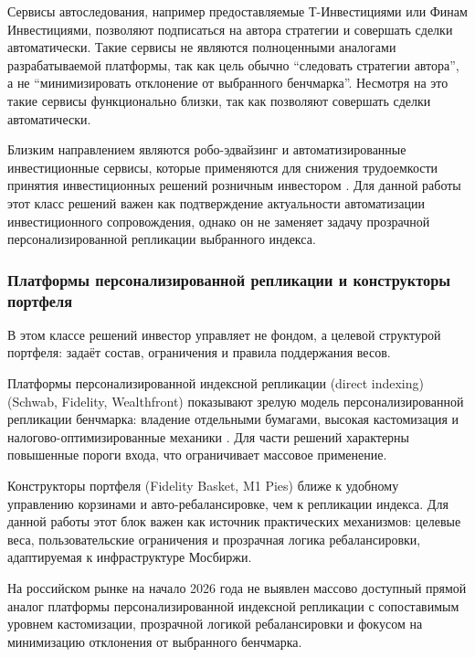 \documentclass[14pt]{gost-7-32}
\begin{document}
Сервисы автоследования, например предоставляемые Т-Инвестициями или Финам Инвестициями, позволяют подписаться на автора стратегии и совершать сделки автоматически. Такие сервисы не являются полноценными аналогами разрабатываемой платформы, так как цель обычно ``следовать стратегии автора'', а не ``минимизировать отклонение от выбранного бенчмарка''. Несмотря на это такие сервисы функционально близки, так как позволяют совершать сделки автоматически.

Близким направлением являются робо-эдвайзинг и автоматизированные инвестиционные сервисы, которые применяются для снижения трудоемкости принятия инвестиционных решений розничным инвестором \cite{loginovFactorInvesting2023,burakRoboAdvising2025}. Для данной работы этот класс решений важен как подтверждение актуальности автоматизации инвестиционного сопровождения, однако он не заменяет задачу прозрачной персонализированной репликации выбранного индекса.

\subsubsection{Платформы персонализированной репликации и конструкторы портфеля}

В этом классе решений инвестор управляет не фондом, а целевой структурой портфеля: задаёт состав, ограничения и правила поддержания весов.

Платформы персонализированной индексной репликации (direct indexing) (Schwab, Fidelity, Wealthfront)\cite{schwabDirectIndexing,fidelityDirectIndexingOverview,wealthfrontInvesting} показывают зрелую модель персонализированной репликации бенчмарка: владение отдельными бумагами, высокая кастомизация и налогово-оптимизированные механики . Для части решений характерны повышенные пороги входа, что ограничивает массовое применение.


Конструкторы портфеля (Fidelity Basket, M1 Pies) \cite{fidelityBasketFaq,m1PieWhatIs} ближе к удобному управлению корзинами и авто-ребалансировке, чем к репликации индекса. Для данной работы этот блок важен как источник практических механизмов: целевые веса, пользовательские ограничения и прозрачная логика ребалансировки, адаптируемая к инфраструктуре Мосбиржи.

На российском рынке на начало 2026 года не выявлен массово доступный прямой аналог платформы персонализированной индексной репликации с сопоставимым уровнем кастомизации, прозрачной логикой ребалансировки и фокусом на минимизацию отклонения от выбранного бенчмарка.
\end{document}

